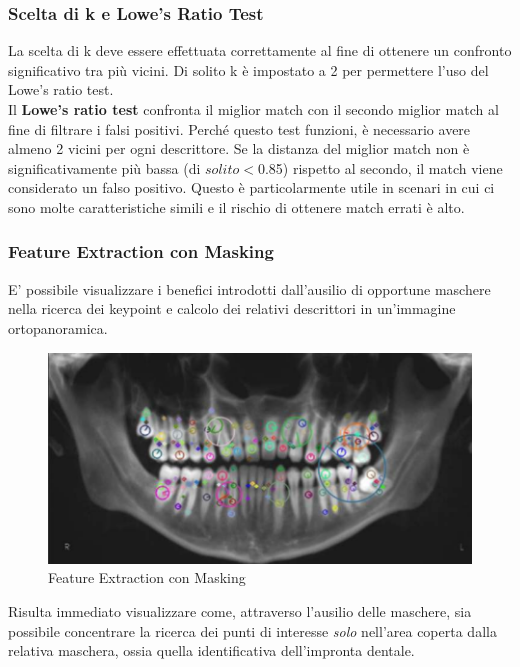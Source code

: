 \documentclass[12pt,a4paper,openright,twoside]{book}
\begin{document}
\subsubsection{Scelta di k e Lowe's Ratio Test}
La scelta di k deve essere effettuata correttamente al fine di ottenere un confronto significativo tra più vicini. Di solito k è impostato a 2 per permettere l'uso del Lowe's ratio test.\\
Il \textbf{Lowe's ratio test} confronta il miglior match con il secondo miglior match al fine di filtrare i falsi positivi. Perché questo test funzioni, è necessario avere almeno 2 vicini per ogni descrittore. Se la distanza del miglior match non è significativamente più bassa (di $solito < $0.85) rispetto al secondo, il match viene considerato un falso positivo. Questo è particolarmente utile in scenari in cui ci sono molte caratteristiche simili e il rischio di ottenere match errati è alto.

\subsubsection{Feature Extraction con Masking}
E' possibile visualizzare i benefici introdotti dall'ausilio di opportune maschere nella ricerca dei keypoint e calcolo dei relativi descrittori in un'immagine ortopanoramica.

\begin{figure}[H]
  	\centering
    	\includegraphics{figures/kpmask.pdf}
    	\caption{Feature Extraction con Masking}
	\label{fig:kpmask}
\end{figure} 

Risulta immediato visualizzare come, attraverso l'ausilio delle maschere, sia possibile concentrare la ricerca dei punti di interesse {\itshape solo} nell'area coperta dalla relativa maschera, ossia quella identificativa dell'impronta dentale.
\end{document}
